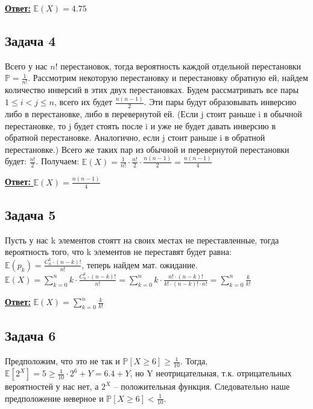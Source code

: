 \documentclass[a4paper,14pt]{article} %
\begin{document}
\underline{\textbf{Ответ:}} $\mathds{E}(X) = 4.75$
\newpage
\subsection{Задача 4}
Всего у нас $n!$ перестановок, тогда вероятность каждой отдельной перестановки $\mathds{P} = \frac{1}{n!}$.
Рассмотрим некоторую перестановку и перестановку обратную ей, найдем количество инверсий в этих двух перестановках.
Будем рассматривать все пары $1 \leq i < j \leq n$, всего их будет $\frac{n(n-1)}{2}$. Эти пары будут образовывать инверсию либо в перестановке, либо в перевернутой ей.
\newline
(Если j стоит раньше i в обычной перестановке, то j будет стоять после i и уже не будет давать инверсию в обратной перестановке. Аналогично, если j стоит раньше i в обратной перестановке.)
Всего же таких пар из обычной и перевернутой перестановки будет: $\frac{n!}{2}$.
Получаем: $\mathds{E}(X) = \frac{1}{n!} \cdot \frac{n!}{2} \cdot \frac{n(n-1)}{2} = \frac{n(n-1)}{4}$

\underline{\textbf{Ответ: }} $\mathds{E}(X) = \frac{n(n-1)}{4}$


\subsection{Задача 5}
Пусть у нас k элементов стоятт на своих местах не переставленные, тогда вероятность того, что k элементов не переставят будет равна:
$\mathds{E}(p_k) = \frac{C_n^k \cdot (n-k)!}{n!}$, теперь найдем мат. ожидание.
\newline
$\mathds{E}(X) = \sum\limits_{k = 0}^n k \cdot \frac{C_n^k \cdot (n-k)!}{n!} = \sum\limits_{k = 0}^n k \cdot \frac{n!\cdot(n-k)!}{k! \cdot (n-k)! \cdot n!} = \sum\limits_{k = 0}^n \frac{k}{k!}$

\underline{\textbf{Ответ:}} $\mathds{E}(X) = \sum\limits_{k = 0}^n \frac{k}{k!}$

\subsection{Задача 6}
Предположим, что это не так и $\mathds{P}[X \geq 6] \geq \frac{1}{10}$.
\newline
Тогда, $\mathds{E}[2^X] = 5 \geq \frac{1}{10} \cdot 2^6 + Y = 6.4 + Y$, но Y неотрицательная, т.к. отрицательных вероятностей у нас нет, а $2^X$ -- положительная функция.
\newline 
Следовательно наше предположение неверное и $\mathds{P}[X \geq 6] < \frac{1}{10}.$
\end{document}
